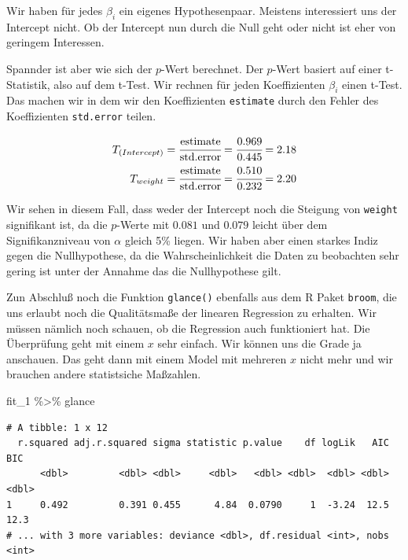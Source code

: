 \documentclass[
  letterpaper,
]{scrbook}
\newenvironment{Shaded}{\begin{snugshade}}{\end{snugshade}}
\newcommand{\NormalTok}[1]{\textcolor[rgb]{0.00,0.23,0.31}{#1}}
\newcommand{\SpecialCharTok}[1]{\textcolor[rgb]{0.37,0.37,0.37}{#1}}
\begin{document}
Wir haben für jedes \(\beta_i\) ein eigenes Hypothesenpaar. Meistens
interessiert uns der Intercept nicht. Ob der Intercept nun durch die
Null geht oder nicht ist eher von geringem Interessen.

Spannder ist aber wie sich der \(p\)-Wert berechnet. Der \(p\)-Wert
basiert auf einer t-Statistik, also auf dem t-Test. Wir rechnen für
jeden Koeffizienten \(\beta_i\) einen t-Test. Das machen wir in dem wir
den Koeffizienten \texttt{estimate} durch den Fehler des Koeffizienten
\texttt{std.error} teilen.

\[
\begin{align*} 
T_{(Intercept)} &= \cfrac{\mbox{estimate}}{\mbox{std.error}}  = \cfrac{0.969}{0.445} = 2.18\\  
T_{weight} &= \cfrac{\mbox{estimate}}{\mbox{std.error}}  = \cfrac{0.510}{0.232} = 2.20\\   
\end{align*}
\]

Wir sehen in diesem Fall, dass weder der Intercept noch die Steigung von
\texttt{weight} signifikant ist, da die \(p\)-Werte mit \(0.081\) und
\(0.079\) leicht über dem Signifikanzniveau von \(\alpha\) gleich 5\%
liegen. Wir haben aber einen starkes Indiz gegen die Nullhypothese, da
die Wahrscheinlichkeit die Daten zu beobachten sehr gering ist unter der
Annahme das die Nullhypothese gilt.

Zun Abschluß noch die Funktion \texttt{glance()} ebenfalls aus dem R
Paket \texttt{broom}, die uns erlaubt noch die Qualitätsmaße der
linearen Regression zu erhalten. Wir müssen nämlich noch schauen, ob die
Regression auch funktioniert hat. Die Überprüfung geht mit einem \(x\)
sehr einfach. Wir können uns die Grade ja anschauen. Das geht dann mit
einem Model mit mehreren \(x\) nicht mehr und wir brauchen andere
statistsiche Maßzahlen.

\begin{Shaded}
\begin{Highlighting}[]
\NormalTok{fit\_1 }\SpecialCharTok{\%\textgreater{}\%}\NormalTok{ glance }
\end{Highlighting}
\end{Shaded}

\begin{verbatim}
# A tibble: 1 x 12
  r.squared adj.r.squared sigma statistic p.value    df logLik   AIC   BIC
      <dbl>         <dbl> <dbl>     <dbl>   <dbl> <dbl>  <dbl> <dbl> <dbl>
1     0.492         0.391 0.455      4.84  0.0790     1  -3.24  12.5  12.3
# ... with 3 more variables: deviance <dbl>, df.residual <int>, nobs <int>
\end{verbatim}
\end{document}
